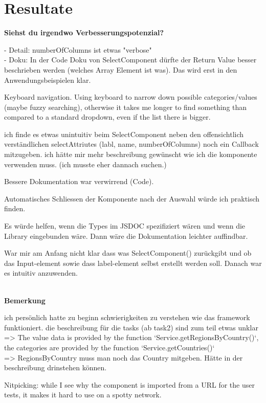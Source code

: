 \section*{Resultate}
\noindent
\textbf{Siehst du irgendwo Verbesserungspotenzial?}

\noindent 
- Detail: numberOfColumns ist etwas "verbose"
\\
- Doku: In der Code Doku von SelectComponent dürfte der Return Value besser beschrieben werden (welches Array Element ist was). 
Das wird erst in den Anwendungsbeispielen klar. 

Keyboard navigation. Using keyboard to narrow down possible categories/values (maybe fuzzy searching), 
otherwise it takes me longer to find something than compared to a standard dropdown, even if the list there is bigger.

ich finde es etwas unintuitiv beim SelectComponent neben den offensichtlich verständlichen selectAttriutes (labl, name, numberOfColumns) noch ein Callback mitzugeben.   
ich hätte mir mehr beschreibung gewünscht wie ich die komponente verwenden muss. (ich musste eher dannach suchen.)

Bessere Dokumentation war verwirrend (Code).

Automatisches Schliessen der Komponente nach der Auswahl würde ich praktisch finden.

Es würde helfen, wenn die Types im JSDOC spezifiziert wären und wenn die Library eingebunden wäre. 
Dann wäre die Dokumentation leichter auffindbar.

War mir am Anfang nicht klar dass was SelectComponent() zurückgibt und ob das Input-element sowie dass label-element selbst erstellt werden soll. 
Danach war es intuitiv anzuwenden.

 \\

\noindent
\textbf{Bemerkung}

ich persönlich hatte zu beginn schwierigkeiten zu verstehen wie das framework funktioniert. 
die beschreibung für die tasks (ab task2) sind zum teil etwas unklar 
\\
=> The value data is provided by the function `Service.getRegionsByCountry()`, 
the categories are provided by the function `Service.getCountries()`  
\\
=> RegionsByCountry muss man noch das Country mitgeben. 
Hätte in der beschreibung drinstehen können.

Nitpicking: while I see why the component is imported from a URL for the user tests, it makes it hard to use on a spotty network.

